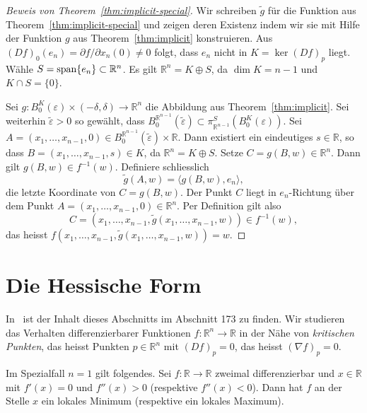 \documentclass[../main.tex]{subfiles}
\begin{document}
\begin{proof}[Beweis von Theorem~\ref{thm:implicit-special}]
  Wir schreiben $\widetilde g$ für die Funktion aus 
  Theorem~\ref{thm:implicit-special}
  und zeigen deren Existenz indem wir sie mit Hilfe der Funktion
  $g$ aus Theorem~\ref{thm:implicit} konstruieren.
  Aus ${(Df)}_0(e_n) = \partial f / \partial x_n ( 0 ) \neq 0$
  folgt, dass  $e_n$ nicht in $K = \ker {(Df)}_p$ liegt.
  Wähle $S = \operatorname{span} \{ e_n \} \subset \mathbb{R}^n$.
  Es gilt $\mathbb{R}^n = K \oplus S$, da
  $\dim K = n-1$ und $K \cap S = \{0\}$.

  Sei $g \colon B_0^K(\varepsilon) \times (-\delta, \delta) \to
  \mathbb{R}^n$ die Abbildung aus  Theorem~\ref{thm:implicit}.
  Sei 
  weiterhin $\widetilde \varepsilon > 0$ so gewählt, dass
  $B_0^{\mathbb{R}^{n-1}}(\widetilde \varepsilon)
  \subset \pi_{\mathbb{R}^{n-1}}^S(B_0^K(\varepsilon))$.
  Sei $A = (x_1, \dots, x_{n-1}, 0) \in B_0^{\mathbb{R}^{n-1}}(\widetilde
  \varepsilon) \times \mathbb{R}$.
  Dann existiert ein eindeutiges $s \in \mathbb{R}$, so dass
  $B = (x_1, \dots, x_{n-1}, s) \in K$,
  da $\mathbb{R}^{n} = K \oplus S$.
  Setze $C = g(B, w) \in \mathbb{R}^n$.
  Dann gilt $g(B, w) \in f^{-1}(w)$.
  Definiere schliesslich 
  \[\widetilde g (A, w) = \langle g(B, w), e_n \rangle,\]
  die letzte Koordinate von $C = g(B, w)$.
  Der Punkt $C$ liegt in $e_n$-Richtung über dem Punkt $A
  = (x_1, \dots, x_{n-1}, 0) \in \mathbb{R}^n$.
  Per Definition gilt also
  \[
  C = (x_1, \dots, x_{n-1}, \widetilde g(x_1, \dots, x_{n-1}, w))
  \in f^{-1}(w),
  \] 
  das heisst 
  $f(x_1, \dots, x_{n-1}, \widetilde g(x_1, \dots, x_{n-1}, w)) = w$.
\end{proof}

\section{Die Hessische Form}
In~\cite{heuser} ist der Inhalt dieses Abschnitts im Abschnitt 173
zu finden.
Wir studieren das Verhalten differenzierbarer Funktionen
$f \colon\mathbb{R}^n \to \mathbb{R}$
in der Nähe von \emph{kritischen Punkten},
das heisst Punkten $p \in \mathbb{R}^n$ 
mit ${(Df)}_p = 0$, das heisst  ${(\nabla f)}_p = 0$.

Im Spezialfall
$n = 1$ 
gilt folgendes. Sei $f \colon \mathbb{R} \to \mathbb{R}$ 
zweimal differenzierbar und $x \in \mathbb{R}$ 
mit $f'(x) = 0$ und $f''(x) > 0$ (respektive $f''(x) < 0$).
Dann hat $f$ an der Stelle $x$ ein lokales Minimum
(respektive ein lokales Maximum).
\end{document}
